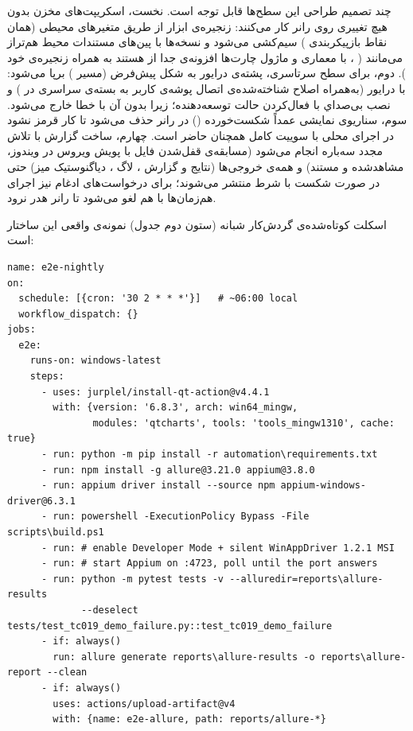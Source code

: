 چند تصمیم طراحی این سطح‌ها قابل توجه است. نخست، اسکریپت‌های مخزن بدون هیچ تغییری روی رانر کار می‌کنند: زنجیره‌ی ابزار از طریق متغیرهای محیطی
(همان نقاط بازپیکربندی
)
سیم‌کشی می‌شود و نسخه‌ها با پین‌های مستندات محیط هم‌تراز می‌مانند (
،
 با معماری
و ماژول
\pdash{} چارت‌ها افزونه‌ی جدا از
هستند \pdash{} به همراه زنجیره‌ی
خود
).
دوم، برای سطح سرتاسری، پشته‌ی درایور به شکل پیش‌فرض (مسیر
)
برپا می‌شود:
با درایور
(به‌همراه اصلاح شناخته‌شده‌ی اتصال پوشه‌ی
کاربر به بسته‌ی سراسری در
)
و نصب بی‌صداي
با فعال‌کردن حالت توسعه‌دهنده؛ زیرا
بدون آن با خطا خارج می‌شود. سوم، سناریوی نمایشی عمداً شکست‌خورده
()
در رانر حذف می‌شود تا کار قرمز نشود \pdash{} در اجرای محلی با سوییت کامل همچنان حاضر است. چهارم، ساخت گزارش با تلاش مجدد سه‌باره انجام می‌شود (مسابقه‌ی قفل‌شدن فایل با پویش ویروس در ویندوز، مشاهد‌شده و مستند) و همه‌ی خروجی‌ها (نتایج و گزارش
،
لاگ
،
دیاگنوستیک میز) حتی در صورت شکست با شرط
منتشر می‌شوند؛ برای درخواست‌های ادغام نیز اجرای هم‌زمان‌ها با هم لغو می‌شود تا رانر هدر نرود.

اسکلت کوتاه‌شده‌ی گردش‌کار شبانه (ستون دوم جدول) نمونه‌ی واقعی این ساختار است:

\begin{latin}
\begin{lstlisting}[numbers=none, basicstyle=\ttfamily\scriptsize]
name: e2e-nightly
on:
  schedule: [{cron: '30 2 * * *'}]   # ~06:00 local
  workflow_dispatch: {}
jobs:
  e2e:
    runs-on: windows-latest
    steps:
      - uses: jurplel/install-qt-action@v4.4.1
        with: {version: '6.8.3', arch: win64_mingw,
               modules: 'qtcharts', tools: 'tools_mingw1310', cache: true}
      - run: python -m pip install -r automation\requirements.txt
      - run: npm install -g allure@3.21.0 appium@3.8.0
      - run: appium driver install --source npm appium-windows-driver@6.3.1
      - run: powershell -ExecutionPolicy Bypass -File scripts\build.ps1
      - run: # enable Developer Mode + silent WinAppDriver 1.2.1 MSI
      - run: # start Appium on :4723, poll until the port answers
      - run: python -m pytest tests -v --alluredir=reports\allure-results
             --deselect tests/test_tc019_demo_failure.py::test_tc019_demo_failure
      - if: always()
        run: allure generate reports\allure-results -o reports\allure-report --clean
      - if: always()
        uses: actions/upload-artifact@v4
        with: {name: e2e-allure, path: reports/allure-*}
\end{lstlisting}
\end{latin}

